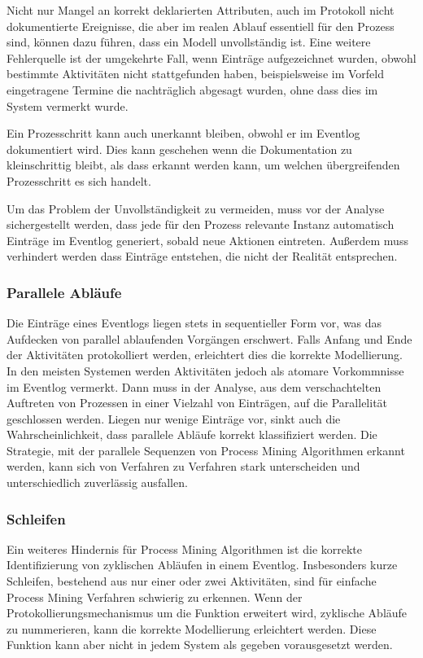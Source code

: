 Nicht nur Mangel an korrekt deklarierten Attributen, auch im Protokoll nicht dokumentierte Ereignisse, die aber im realen Ablauf essentiell für den Prozess sind, können dazu führen, dass ein Modell unvollständig ist. Eine weitere Fehlerquelle ist der umgekehrte Fall, wenn Einträge aufgezeichnet wurden, obwohl bestimmte Aktivitäten nicht stattgefunden haben, beispielsweise im Vorfeld eingetragene Termine die nachträglich abgesagt wurden, ohne dass dies im System vermerkt wurde. 

Ein Prozesschritt kann auch unerkannt bleiben, obwohl er im Eventlog dokumentiert wird. Dies kann geschehen wenn die Dokumentation zu kleinschrittig bleibt, als dass erkannt werden kann, um welchen übergreifenden Prozesschritt es sich handelt. 

Um das Problem der Unvollständigkeit zu vermeiden, muss vor der Analyse sichergestellt werden, dass jede für den Prozess relevante Instanz automatisch Einträge im Eventlog generiert, sobald neue Aktionen eintreten. Außerdem muss  verhindert werden dass Einträge entstehen, die nicht der Realität entsprechen.

\subsubsection{Parallele Abläufe}
Die Einträge eines Eventlogs liegen stets in sequentieller Form vor, was das Aufdecken von parallel ablaufenden Vorgängen erschwert. Falls Anfang und Ende der Aktivitäten protokolliert werden, erleichtert dies die korrekte Modellierung. In den meisten Systemen werden Aktivitäten jedoch als atomare Vorkommnisse im Eventlog vermerkt. Dann muss in der Analyse, aus dem verschachtelten Auftreten von Prozessen in einer Vielzahl von Einträgen, auf die Parallelität geschlossen werden. Liegen nur wenige Einträge vor, sinkt auch die Wahrscheinlichkeit, dass parallele Abläufe korrekt klassifiziert werden. Die Strategie, mit der parallele Sequenzen von Process Mining Algorithmen erkannt werden, kann sich von Verfahren zu Verfahren stark unterscheiden und unterschiedlich zuverlässig ausfallen.

\subsubsection{Schleifen}
Ein weiteres Hindernis für Process Mining Algorithmen ist die korrekte Identifizierung von zyklischen Abläufen in einem Eventlog. Insbesonders kurze Schleifen, bestehend aus nur einer oder zwei Aktivitäten, sind für einfache Process Mining Verfahren schwierig zu erkennen. 
Wenn der Protokollierungsmechanismus um die Funktion erweitert wird, zyklische Abläufe zu nummerieren, kann die korrekte Modellierung erleichtert werden. Diese Funktion kann aber nicht in jedem System als gegeben vorausgesetzt werden.

